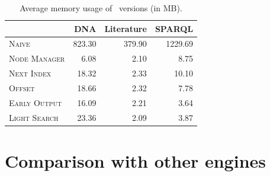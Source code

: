 \begin{table}[t]
	\caption{Average memory usage of \rematch\ versions (in MB).}
	\begin{tabular}{l|rrr}
		                      & \textsf{DNA} & \textsf{Literature} &
		                      \textsf{SPARQL} \\
		\hline
		\textsc{Naive}        & 823.30        & 379.90               & 1229.69
		\\
		\textsc{Node Manager} & 6.08         & 2.10                 & 8.75 \\
		\textsc{Next Index}   & 18.32        & 2.33                & 10.10 \\
		\textsc{Offset}       & 18.66        & 2.32                & 7.78 \\
		\textsc{Early Output} & 16.09        & 2.21                & 3.64 \\
		\textsc{Light Search} & 23.36        & 2.09                & 3.87
	\end{tabular}
	\label{tab-memory}
\end{table}

\section{Comparison with other engines}\label{ss:comp}



